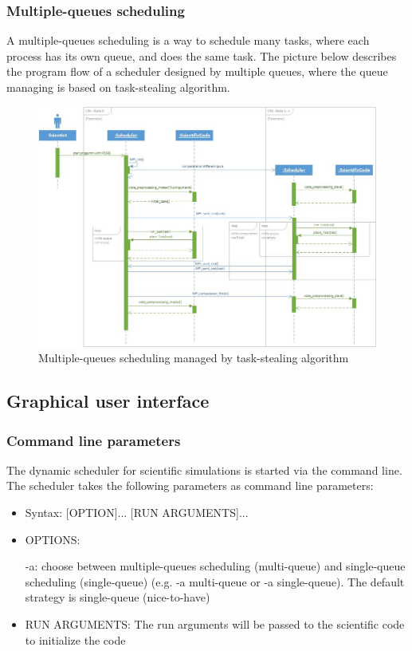 \subsubsection{Multiple-queues scheduling}	
\vspace{0.5cm}
A multiple-queues scheduling is a way to schedule many tasks, where each process has its own queue, and does the same task. The picture below describes the program flow of a scheduler designed by multiple queues, where the queue managing is based on task-stealing algorithm.
\vspace{1cm}
	\begin{figure}[H]
	\centering
	\includegraphics[width=15cm]{images/Task-stealing.jpg}
	\caption{Multiple-queues scheduling managed by task-stealing algorithm}
	\end{figure}
\newpage
	
\subsection{Graphical user interface}
	\subsubsection{Command line parameters}
		The dynamic scheduler for scientific simulations is started via the command line. The scheduler takes the following parameters as command line parameters:
	
		\begin{itemize}	
			\item Syntax: [OPTION]... [RUN ARGUMENTS]...
				
			\item OPTIONS:
							
				\subitem -a: choose between multiple-queues scheduling (multi-queue) and single-queue scheduling (single-queue) (e.g. -a multi-queue or -a single-queue). The default strategy is single-queue (nice-to-have)
					
			\item RUN ARGUMENTS:
				\subitem The run arguments will be passed to the scientific code to initialize the code
		\end{itemize}
		
